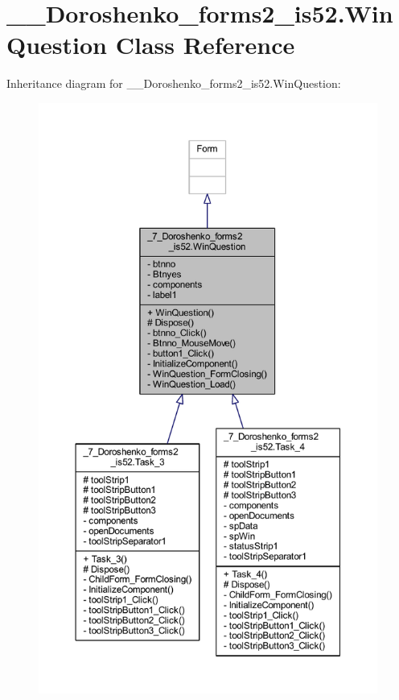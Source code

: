 \hypertarget{class__7___doroshenko__forms2__is52_1_1_win_question}{}\section{\+\_\+\_\+\+Doroshenko\+\_\+forms2\+\_\+is52.\+Win\+Question Class Reference}
\label{class__7___doroshenko__forms2__is52_1_1_win_question}


Inheritance diagram for \+\_\+\_\+\+Doroshenko\+\_\+forms2\+\_\+is52.\+Win\+Question\+:
\nopagebreak
\begin{figure}[H]
\begin{center}
\leavevmode
\includegraphics[height=550pt]{class__7___doroshenko__forms2__is52_1_1_win_question__inherit__graph}
\end{center}
\end{figure}


